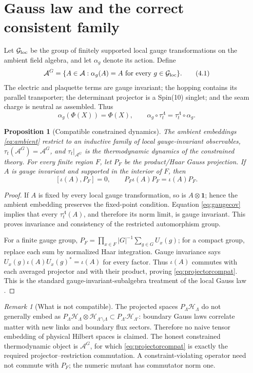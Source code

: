 \documentclass[11pt]{article}
\newtheorem{proposition}[theorem]{Proposition}
\theoremstyle{remark}
\newtheorem{remark}[theorem]{Remark}
\newcommand{\A}{\mathcal A}
\newcommand{\Hh}{\mathcal H}
\newcommand{\id}{\mathbf 1}
\begin{document}
\section{Gauss law and the correct consistent family}

Let \(\mathcal G_{\rm loc}\) be the group of finitely supported local gauge
transformations on the ambient field algebra, and let \(\alpha_g\) denote
its action.  Define
\[
 \A^G=\{A\in\A:\alpha_g(A)=A\text{ for every }g\in\mathcal G_{\rm loc}\}.
\tag{4.1}\label{eq:fixed}
\]
The electric and plaquette terms are gauge invariant; the hopping contains
its parallel transporter; the determinant projector is a Spin(10) singlet;
and the seam charge is neutral as assembled.  Thus
\[
 \alpha_g(\Phi(X))=\Phi(X),\qquad
 \alpha_g\circ\tau_t^\Lambda=\tau_t^\Lambda\circ\alpha_g.
\tag{4.2}\label{eq:gaugecov}
\]

\begin{proposition}[Compatible constrained dynamics]
\label{prop:gauss}
The ambient embeddings \eqref{eq:ambient} restrict to an inductive family
of local gauge-invariant observables, \(\tau_t(\A^G)=\A^G\), and
\(\tau_t|_{\A^G}\) is the thermodynamic dynamics of the constrained theory.
For every finite region \(F\), let \(P_F\) be the product/Haar Gauss
projection.  If \(A\) is gauge invariant and supported in the interior of
\(F\), then
\[
 [\iota(A),P_F]=0,\qquad
 P_F\iota(A)P_F=\iota(A)P_F.
\tag{4.3}\label{eq:projectorcompat}
\]
\end{proposition}

\begin{proof}
If \(A\) is fixed by every local gauge transformation, so is
\(A\otimes\id\); hence the ambient embedding preserves the fixed-point
condition.  Equation \eqref{eq:gaugecov} implies that every
\(\tau_t^\Lambda(A)\), and therefore its norm limit, is gauge invariant.
This proves invariance and consistency of the restricted automorphism
group.

For a finite gauge group,
\(P_F=\prod_{x\in F}|G|^{-1}\sum_{g\in G}U_x(g)\); for a compact group,
replace each sum by normalized Haar integration.  Gauge invariance says
\(U_x(g)\iota(A)U_x(g)^*=\iota(A)\) for every factor.  Thus \(\iota(A)\)
commutes with each averaged projector and with their product, proving
\eqref{eq:projectorcompat}.  This is the standard
gauge-invariant-subalgebra treatment of the local Gauss law
\cite{GrundlingLledo,GrundlingRudolph}.
\end{proof}

\begin{remark}[What is not compatible]
The projected spaces \(P_\Lambda\Hh_\Lambda\) do not generally embed as
\(P_\Lambda\Hh_\Lambda\otimes\Hh_{\Lambda'\setminus\Lambda}\subset
P_{\Lambda'}\Hh_{\Lambda'}\): boundary Gauss laws correlate matter with
new links and boundary flux sectors.  Therefore no naive tensor embedding
of physical Hilbert spaces is claimed.  The honest constrained
thermodynamic object is \(\A^G\), for which
\eqref{eq:projectorcompat} is exactly the required projector--restriction
commutation.  A constraint-violating operator need not commute with
\(P_F\); the numeric mutant has commutator norm one.
\end{remark}
\end{document}

